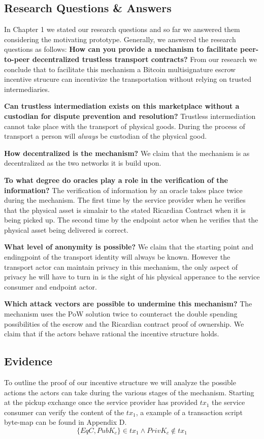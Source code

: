 \subsection{Research Questions \& Answers}

In Chapter 1 we stated our research questions and so far we answered them considering the motivating prototype. Generally, we answered the research questions as follows:
\bigbreak
\noindent \textbf{How can you provide a mechanism to facilitate peer-to-peer decentralized trustless transport contracts?} From our research we conclude that to facilitate this mechanism a Bitcoin multisignature escrow incentive strucure can incentivize the transportation without relying on trusted intermediaries.

\bigbreak
\noindent \textbf{Can trustless intermediation exists on this marketplace without a custodian for dispute prevention and resolution?} Trustless intermediation cannot take place with the transport of physical goods. During the process of transport a person will \textit{always} be custodian of the physical good.

\bigbreak
\noindent \textbf{How decentralized is the mechanism?} We claim that the mechanism is as decentralized as the two networks it is build upon.

\bigbreak
\noindent \textbf{To what degree do oracles play a role in the verification of the information?} The verification of information by an oracle takes place twice during the mechanism. The first time by the service provider when he verifies that the physical asset is simalair to the stated Ricardian Contract when it is being picked up. The second time by the endpoint actor when he verifies that the physical asset being delivered is correct.

\bigbreak
\noindent \textbf{What level of anonymity is possible?} We claim that the starting point and endingpoint of the transport identity will always be known. However the transport actor can maintain privacy in this mechanism, the only aspect of privacy he will have to turn in is the sight of his physical apperance to the service consumer and endpoint actor.

\bigbreak
\noindent \textbf{Which attack vectors are possible to undermine this mechanism?} The mechanism uses the PoW solution twice to counteract the double spending possibilities of the escrow and the Ricardian contract proof of ownership. We claim that if the actors behave rational the incentive structure holds.

\subsection{Evidence}

To outline the proof of our incentive structure we will analyze the possible actions the actors can take during the various stages of the mechanism. Starting at the pickup exchange once the service provider has provided $tx_1$ the service consumer can verify the content of the $tx_1$, a example of a transaction script byte-map can be found in Appendix D. 
\[\{EqC, PubK_c\}\in tx_1 \land PrivK_c \notin tx_1\]
